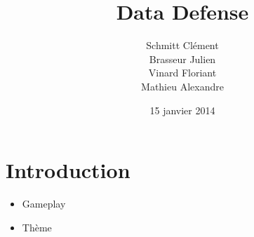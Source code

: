 \documentclass[usepdftitle=false]{beamer}
\title{Data Defense}
\author{Schmitt Clément \\ Brasseur Julien \\ Vinard Floriant \\ Mathieu Alexandre}
\institute{Université Montpellier II}
\date{15 janvier 2014}
\begin{document}
	\begin{frame}
		\titlepage
	\end{frame}
	
	\begin{frame}
		\tableofcontents[hideallsubsections]
	\end{frame}
	
	\section{Introduction}
	\begin{frame}
		\begin{itemize}
			\item Gameplay
			\item Thème
		\end{itemize}
	\end{frame}
	
\end{document}
